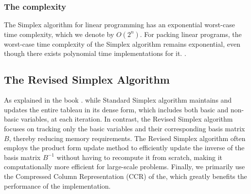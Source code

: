 \subsubsection{The complexity}
The Simplex algorithm for linear programming has an 
exponential worst-case time complexity, which we denote by \( O(2^n) \).
For packing linear programs, the worst-case time complexity of the Simplex algorithm 
remains exponential, even though there exists polynomial time implementations for it.
\parencite{stille2010solution}.


\subsection{The Revised Simplex Algorithm}
As explained in the book \parencite{chvatal1983linear}. 
while Standard Simplex algorithm maintains and updates the entire tableau in its dense form,
 which includes both basic and non-basic variables, at each iteration. 
 In contrast, the Revised Simplex algorithm focuses on tracking only 
 the basic variables and their corresponding basis matrix $B$, 
 thereby reducing memory requirements. 
 The Revised Simplex algorithm often employs 
 the product form update method to efficiently 
 update the inverse of the basis matrix $B^{-1}$ 
 without having to recompute it from scratch, 
 making it computationally more efficient for large-scale problems. 
 Finally, we primarily use the Compressed Column Representation (CCR) of the, 
 which greatly benefits the performance of the implementation.
